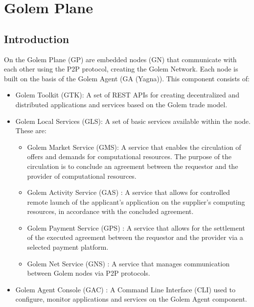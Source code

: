 \section{Golem Plane}

\subsection{Introduction}

On the Golem Plane (GP) are embedded nodes (GN) that communicate with each other using the P2P protocol, creating the Golem Network.
Each node is built on the basis of the Golem Agent (GA (Yagna)). This component consists of:

\begin{itemize}

\item Golem Toolkit (GTK): A set of REST APIs for creating decentralized and distributed applications and services based on the Golem trade model.

\item Golem Local Services (GLS): A set of basic services available within the node. These are:

\begin{itemize}

\item Golem Market Service (GMS): A service that enables the circulation of offers and demands for computational resources.
The purpose of the circulation is to conclude an agreement between the requestor and the provider of computational resources.

\item Golem Activity Service (GAS) : A service that allows for controlled remote launch of the applicant's application on the supplier's computing resources, 
in accordance with the concluded agreement.

\item Golem Payment Service (GPS) : A service that allows for the settlement of the executed agreement between the requestor and the provider 
via a selected payment platform.

\item Golem Net Service (GNS) : A service that manages communication between Golem nodes via P2P protocols.

\end{itemize}

\item Golem Agent Console (GAC) : A Command Line Interface (CLI) used to configure, monitor applications and services on the Golem Agent component.


\end{itemize}
